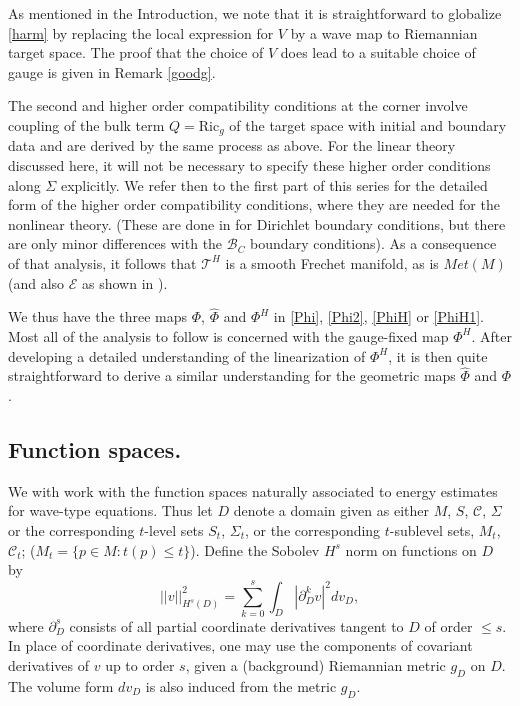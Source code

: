 \documentclass[10pt]{amsart}
\newcommand{\Si}{\Sigma}
\newcommand{\cC}{{\mathcal C}}
\newcommand{\cT}{{\mathcal T}}
\newcommand{\cB}{{\mathcal B}}
\newcommand{\cE}{{\mathcal E}}
\newcommand{\Ric}{\mathrm{Ric}}
\newcommand{\p}{\partial}
\renewcommand{\hat}{\widehat}
\newcommand{\<}{\langle}
\renewcommand{\>}{\rangle}
\theoremstyle{plain}
\theoremstyle{remark}
\theoremstyle{definition}
\numberwithin{equation}{section}
\begin{document}
  As mentioned in the Introduction, we note that it is straightforward to globalize \eqref{harm} by replacing the local 
expression for $V$ by a wave map to Riemannian target space. The proof that the choice of $V$ does lead to a suitable choice of gauge is 
given in Remark \ref{goodg}. 

\medskip 

  The second and higher order compatibility conditions at the corner involve coupling of the bulk term $Q = \Ric_g$ of the target 
space with initial and boundary data and are derived by the same process as above. For the linear theory discussed here, it will not be 
necessary to specify these higher order conditions along $\Si$ explicitly. We refer then to the first part \cite{I} of this series for the 
detailed form of the higher order compatibility conditions, where they are needed for the nonlinear theory. (These are done in \cite{II} 
for Dirichlet boundary conditions, but there are only minor differences with the $\cB_C$ boundary conditions). As a consequence of 
that analysis, it follows that $\cT^H$ is a smooth Frechet manifold, as is $Met(M)$ (and also $\cE$ as shown in \cite{II}). 

   We thus have the three maps $\Phi$, $\hat \Phi$ and $\Phi^H$ in \eqref{Phi}, \eqref{Phi2}, \eqref{PhiH} or \eqref{PhiH1}. Most all of the analysis 
to follow is concerned with the gauge-fixed map $\Phi^H$. After developing a detailed understanding of the linearization of $\Phi^H$, 
it is then quite straightforward to derive a similar understanding for the geometric maps $\hat \Phi$ and $\Phi$. 


\subsection{Function spaces.}


  We with work with the function spaces naturally associated to energy estimates for wave-type equations. Thus let $D$ denote a domain given as either $M$, $S$, 
$\cC$, $\Si$ or the corresponding $t$-level sets $S_t$, $\Si_t$, or the corresponding $t$-sublevel sets, $M_t$, $\cC_t$; ($M_t = \{p \in M: t(p) \leq t\}$). Define the 
Sobolev $H^s$ norm on functions on $D$ by 
 $$||v||_{H^s(D)}^2 = \sum_{k=0}^s \int_{D} |\p_D^k v|^2dv_D,$$
where $\p_D^s$ consists of all partial coordinate derivatives tangent to $D$ of order $\leq s$. In place of coordinate derivatives, one may use the 
components of covariant derivatives of $v$ up to order $s$, given a (background) Riemannian metric $g_D$ on $D$. The volume form $dv_D$ is also 
induced from the metric $g_{D}$.  
\end{document}
